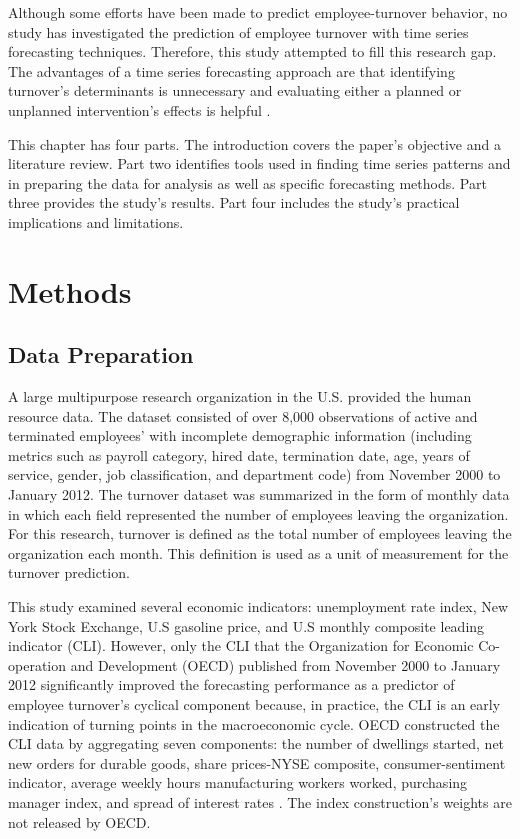 Although some efforts have been made to predict employee-turnover behavior, no study has investigated the prediction of employee turnover with time series forecasting techniques. Therefore, this study attempted to fill this research gap. The advantages of a time series forecasting approach are that identifying turnover's determinants is unnecessary and evaluating either a planned or unplanned intervention's effects is helpful  \citep{velicer2003}.  

This chapter  has four parts. The introduction covers the paper's objective and a literature review. Part two identifies tools used in finding time series patterns and in preparing the data for analysis as well as specific forecasting methods. Part three provides the study's results. Part four includes the study's practical implications and limitations.   
\section{Methods}
\subsection{Data Preparation}
 A large multipurpose research organization in the U.S. provided the human resource data. The dataset consisted of over 8,000 observations of active and terminated employees' with incomplete demographic information (including metrics such as payroll category, hired date, termination date, age, years of service, gender, job classification, and department code) from November 2000 to January 2012. The turnover dataset was summarized in the form of monthly data in which each field represented the number of employees leaving the organization. For this research, turnover is defined as the total  number of employees leaving the organization each month. This definition is used as a unit of measurement for the turnover prediction. 

This study examined several economic indicators: unemployment rate index, New York Stock Exchange, U.S gasoline price, and U.S monthly composite leading indicator (CLI). However, only the CLI that the Organization for Economic Co-operation and Development (OECD) published from November 2000 to January 2012 significantly improved the forecasting performance as a predictor of employee turnover's cyclical component because, in practice,  the CLI is an early indication of turning points in the macroeconomic cycle. OECD constructed the CLI data by aggregating seven components: the number of dwellings started, net new orders for durable goods, share prices-NYSE composite, consumer-sentiment indicator, average weekly hours manufacturing workers worked, purchasing manager index, and spread of interest rates \citep{oecd2013}. The index construction's weights are not released by OECD.
